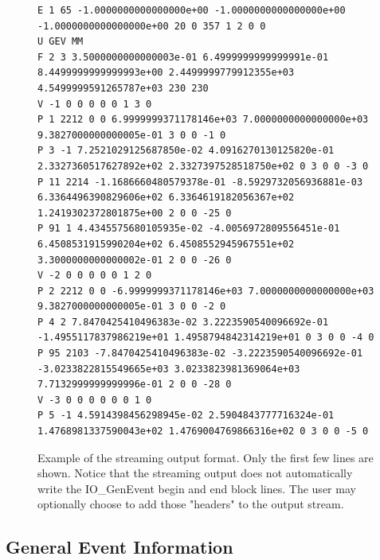 \documentclass[11pt,letterpaper]{article}
\begin{document}
\begin{figure}[h]
  \begin{center}
{\tiny \begin{verbatim}
E 1 65 -1.0000000000000000e+00 -1.0000000000000000e+00 -1.0000000000000000e+00 20 0 357 1 2 0 0
U GEV MM
F 2 3 3.5000000000000003e-01 6.4999999999999991e-01 8.4499999999999993e+00 2.4499999779912355e+03 4.5499999591265787e+03 230 230
V -1 0 0 0 0 0 1 3 0
P 1 2212 0 0 6.9999999371178146e+03 7.0000000000000000e+03 9.3827000000000005e-01 3 0 0 -1 0
P 3 -1 7.2521029125687850e-02 4.0916270130125820e-01 2.3327360517627892e+02 2.3327397528518750e+02 0 3 0 0 -3 0
P 11 2214 -1.1686660480579378e-01 -8.5929732056936881e-03 6.3364496390829606e+02 6.3364619182056367e+02 1.2419302372801875e+00 2 0 0 -25 0
P 91 1 4.4345575680105935e-02 -4.0056972809556451e-01 6.4508531915990204e+02 6.4508552945967551e+02 3.3000000000000002e-01 2 0 0 -26 0
V -2 0 0 0 0 0 1 2 0
P 2 2212 0 0 -6.9999999371178146e+03 7.0000000000000000e+03 9.3827000000000005e-01 3 0 0 -2 0
P 4 2 7.8470425410496383e-02 3.2223590540096692e-01 -1.4955117837986219e+01 1.4958794842314219e+01 0 3 0 0 -4 0
P 95 2103 -7.8470425410496383e-02 -3.2223590540096692e-01 -3.0233822815549665e+03 3.0233823981369064e+03 7.7132999999999996e-01 2 0 0 -28 0
V -3 0 0 0 0 0 0 1 0
P 5 -1 4.5914398456298945e-02 2.5904843777716324e-01 1.4768981337590043e+02 1.4769004769866316e+02 0 3 0 0 -5 0
\end{verbatim}}
  \end{center}
  \caption[Example of ascii format]
          {\label{ascii_stream} Example of the streaming output format.
           Only the first few lines are shown. 
	   Notice that the streaming output does not automatically
	   write the IO\_GenEvent begin and end block lines.
	   The user may optionally choose to add those "headers" to the 
	   output stream. }
\end{figure}

\clearpage

%
%

\subsection{General Event Information}
\end{document}
